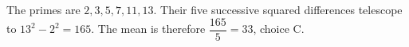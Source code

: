 The primes are $ 2,3,5,7,11,13 $. Their five successive squared differences telescope to $ 13^2-2^2=165 $. The mean is therefore $\dfrac{165}{5}=\boxed{33}$, choice C.
